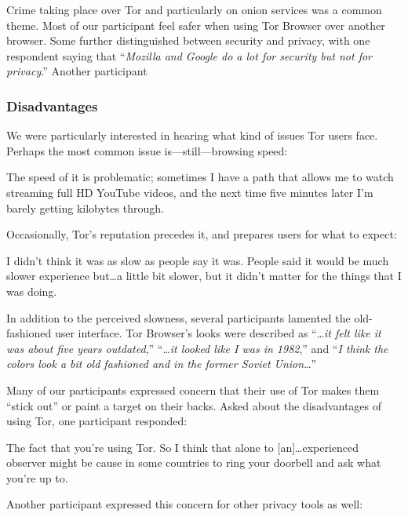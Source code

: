 Crime taking place over Tor and particularly on onion services was a common
theme.  Most of our participant feel safer when using Tor Browser over another
browser.  Some further distinguished between security and privacy, with one
respondent saying that ``\emph{Mozilla and Google do a lot for security but not
for privacy}.''  Another participant 

\subsubsection{Disadvantages}

We were particularly interested in hearing what kind of issues Tor users face.
Perhaps the most common issue is---still---browsing speed:

\begin{displayquote}
The speed of it is problematic; sometimes I have a path that allows me to watch
streaming full HD YouTube videos, and the next time five minutes later I'm
barely getting kilobytes through.
\end{displayquote}

Occasionally, Tor's reputation precedes it, and prepares users for what to
expect:

\begin{displayquote}
I didn't think it was as slow as people say it was. People said it would be much
slower experience but\ldots a little bit slower, but it didn't matter for the
things that I was doing.
\end{displayquote}

In addition to the perceived slowness, several participants lamented the
old-fashioned user interface.  Tor Browser's looks were described as
``\dots\emph{it felt like it was about five years outdated},'' ``\dots\emph{it
looked like I was in 1982},'' and ``\emph{I think the colors look a bit old
fashioned and in the former Soviet Union}\dots''

Many of our participants expressed concern that their use of Tor makes them
``stick out'' or paint a target on their backs.  Asked about the disadvantages
of using Tor, one participant responded:

\begin{displayquote}
The fact that you're using Tor.  So I think that alone to [an]\dots experienced
observer might be cause in some countries to ring your doorbell and ask what
you're up to.
\end{displayquote}

Another participant expressed this concern for other privacy tools as well:

